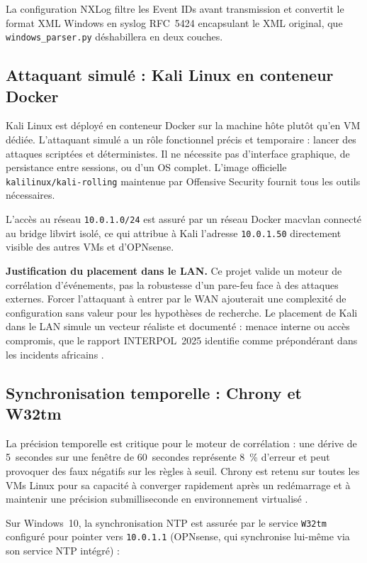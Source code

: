 \documentclass[12pt,a4paper]{article}
\begin{document}
La configuration NXLog filtre les Event IDs avant transmission et convertit
le format XML Windows en syslog RFC~5424 encapsulant le XML original,
que \texttt{windows\_parser.py} déshabillera en deux couches.

\subsection{Attaquant simulé : Kali Linux en conteneur Docker}

Kali Linux est déployé en conteneur Docker sur la machine hôte plutôt
qu'en VM dédiée. L'attaquant simulé a un rôle fonctionnel précis et
temporaire : lancer des attaques scriptées et déterministes. Il ne
nécessite pas d'interface graphique, de persistance entre sessions, ou
d'un OS complet. L'image officielle \texttt{kalilinux/kali-rolling}
maintenue par Offensive Security \cite{kali_docker} fournit tous les
outils nécessaires.

L'accès au réseau \texttt{10.0.1.0/24} est assuré par un réseau Docker
macvlan connecté au bridge libvirt isolé, ce qui attribue à Kali
l'adresse \texttt{10.0.1.50} directement visible des autres VMs et
d'OPNsense.

\textbf{Justification du placement dans le LAN.} Ce projet valide un
moteur de corrélation d'événements, pas la robustesse d'un pare-feu
face à des attaques externes. Forcer l'attaquant à entrer par le WAN
ajouterait une complexité de configuration sans valeur pour les
hypothèses de recherche. Le placement de Kali dans le LAN simule un
vecteur réaliste et documenté : menace interne ou accès compromis,
que le rapport INTERPOL~2025 identifie comme prépondérant dans les
incidents africains \cite{interpol2025}.

\subsection{Synchronisation temporelle : Chrony et W32tm}

La précision temporelle est critique pour le moteur de corrélation :
une dérive de 5~secondes sur une fenêtre de 60~secondes représente
8~\% d'erreur et peut provoquer des faux négatifs sur les règles à
seuil. Chrony est retenu sur toutes les VMs Linux pour sa capacité
à converger rapidement après un redémarrage et à maintenir une
précision submilliseconde en environnement virtualisé \cite{chrony_docs}.

Sur Windows~10, la synchronisation NTP est assurée par le service
\texttt{W32tm} configuré pour pointer vers \texttt{10.0.1.1}
(OPNsense, qui synchronise lui-même via son service NTP intégré) :
\end{document}
